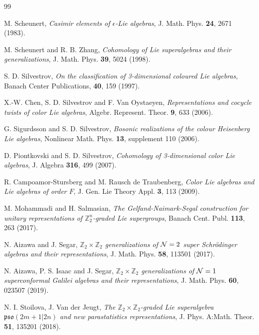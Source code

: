 \documentclass[a4paper,12pt]{article}
\theoremstyle{plain}
\theoremstyle{definition}
\begin{document}
\begin{thebibliography}{99}

 M. Scheunert, \textit{Casimir elements of $\epsilon$-Lie algebras}, 
J. Math. Phys. \textbf{24}, 2671 (1983).

 M. Scheunert and R. B. Zhang, 
\textit{Cohomology of Lie superalgebras and their generalizations}, 
J. Math. Phys. \textbf{39}, 5024 (1998). 

 S. D. Silvestrov, 
\textit{On the classification of 3-dimensional coloured Lie algebras},  
Banach Center Publications, \textbf{40}, 159 (1997).


  X.-W. Chen, S. D. Silvestrov and F. Van Oystaeyen, 
\textit{Representations and cocycle twists of color Lie algebras}, 
Algebr. Represent. Theor. \textbf{9}, 633 (2006).

 G. Sigurdsson and S. D. Silvestrov, 
\textit{Bosonic realizations of the colour Heisenberg Lie algebras},
Nonlinear Math. Phys. \textbf{13}, supplement  110 (2006).

 D. Piontkovski and S. D. Silvestrov, 
\textit{Cohomology of 3-dimensional color Lie algebras},
J. Algebra \textbf{316}, 499 (2007).


 R. Campoamor-Stursberg and M. Rausch de Traubenberg, 
\textit{Color Lie algebras and Lie algebras of order $F$},
J. Gen. Lie Theory Appl. \textbf{3}, 113 (2009). 

 M. Mohammadi and H.  Salmasian, \textit{The Gelfand-Naimark-Segal construction for unitary representations of $\mathbb Z_2^n$-graded Lie supergroups}, 
Banach Cent. Publ. \textbf{113}, 263 (2017). 


 N. Aizawa and J. Segar, 
\textit{$\mathbb{Z}_2 \times \mathbb{Z}_2$ generalizations of ${\cal N} = 2$ super Schr\"odinger  algebras and their representations}, 
J. Math. Phys. \textbf{58}, 113501 (2017).

 N. Aizawa, P. S. Isaac and J. Segar,
\textit{${\mathbb Z}_2\times {\mathbb Z}_2$ generalizations of ${\cal N} = 1$  superconformal Galilei algebras and their representations}, 
J.  Math. Phys. \textbf{60}, 023507 (2019). 

 N. I. Stoilova, J. Van der Jeugt, 
\textit{The $\mathbb{Z}_2 \times \mathbb{Z}_2$-graded Lie superalgebra $ \mathfrak{pso}(2m+1|2n) $ and new parastatistics representations}, 
J. Phys. A:Math. Theor. \textbf{51}, 135201 (2018).


\end{thebibliography}
\end{document}
